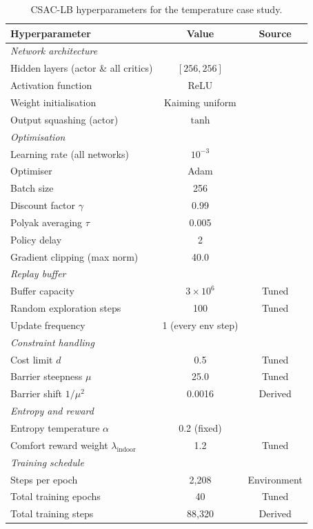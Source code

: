 \begin{table}[htbp]
\centering
\caption{CSAC-LB hyperparameters for the temperature case study.}
\label{tab:csac-hyperparams}
\begin{tabular}{lcc}
\toprule
\textbf{Hyperparameter} & \textbf{Value} & \textbf{Source} \\
\midrule
\multicolumn{3}{l}{\textit{Network architecture}} \\
Hidden layers (actor \& all critics) & $[256, 256]$ & \cite{zhang2024csaclb} \\
Activation function & ReLU & \cite{zhang2024csaclb} \\
Weight initialisation & Kaiming uniform & \cite{zhang2024csaclb} \\
Output squashing (actor) & $\tanh$ & \cite{haarnoja2018sac} \\
\midrule
\multicolumn{3}{l}{\textit{Optimisation}} \\
Learning rate (all networks) & $10^{-3}$ & \cite{zhang2024csaclb} \\
Optimiser & Adam & \cite{zhang2024csaclb} \\
Batch size & 256 & \cite{zhang2024csaclb} \\
Discount factor $\gamma$ & 0.99 & \cite{zhang2024csaclb} \\
Polyak averaging $\tau$ & 0.005 & \cite{zhang2024csaclb} \\
Policy delay & 2 & \cite{zhang2024csaclb} \\
Gradient clipping (max norm) & 40.0 & \cite{zhang2024csaclb} \\
\midrule
\multicolumn{3}{l}{\textit{Replay buffer}} \\
Buffer capacity & $3 \times 10^6$ & Tuned \\
Random exploration steps & 100 & Tuned \\
Update frequency & 1 (every env step) & \cite{zhang2024csaclb} \\
\midrule
\multicolumn{3}{l}{\textit{Constraint handling}} \\
Cost limit $d$ & 0.5 & Tuned \\
Barrier steepness $\mu$ & 25.0 & Tuned \\
Barrier shift $1/\mu^2$ & 0.0016 & Derived \\
\midrule
\multicolumn{3}{l}{\textit{Entropy and reward}} \\
Entropy temperature $\alpha$ & 0.2 (fixed) & \cite{zhang2024csaclb} \\
Comfort reward weight $\lambda_{\text{indoor}}$ & 1.2 & Tuned \\
\midrule
\multicolumn{3}{l}{\textit{Training schedule}} \\
Steps per epoch & 2,208 & Environment \\
Total training epochs & 40 & Tuned \\
Total training steps & 88,320 & Derived \\
\bottomrule
\end{tabular}
\end{table}

